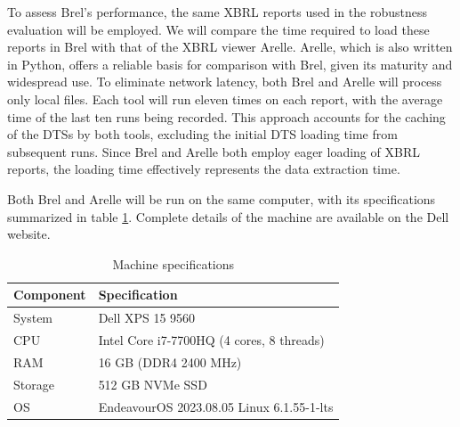 To assess Brel's performance, the same XBRL reports used in the robustness evaluation will be employed.
We will compare the time required to load these reports in Brel
with that of the XBRL viewer Arelle\cite{arelle}.
Arelle, which is also written in Python,
offers a reliable basis for comparison with Brel, given its maturity and widespread use.
To eliminate network latency, both Brel and Arelle will process only local files.
Each tool will run eleven times on each report, with the average time of the last ten runs being recorded.
This approach accounts for the caching of the DTSs by both tools,
excluding the initial DTS loading time from subsequent runs.
Since Brel and Arelle both employ eager loading of XBRL reports,
the loading time effectively represents the data extraction time.

Both Brel and Arelle will be run on the same computer,
with its specifications summarized in table \ref{tab:machine-specs}.
Complete details of the machine are available on the Dell website\cite{dell_xps_9560_specs}.

\begin{table}[H]
    \centering
    \small
    \begin{tabular}{|l|l|}
        \hline
        \textbf{Component} & \textbf{Specification} \\
        \hline
        System & Dell XPS 15 9560 \\
        CPU & Intel Core i7-7700HQ (4 cores, 8 threads) \\
        RAM & 16 GB (DDR4 2400 MHz) \\
        Storage & 512 GB NVMe SSD \\
        OS & EndeavourOS 2023.08.05 Linux 6.1.55-1-lts \\
        \hline
    \end{tabular}
    \caption{Machine specifications\cite{dell_xps_9560_specs}}
    \label{tab:machine-specs}
\end{table}


